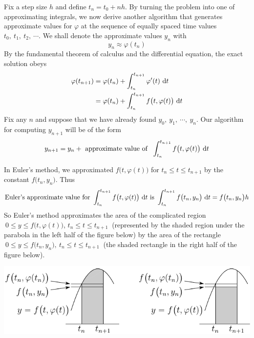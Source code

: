Fix a step size $h$ and define $t_n=t_0+nh$. By turning the problem into one 
of approximating integrals, we now derive another algorithm
that generates approximate values for $\varphi$ at the sequence of equally
spaced time values $t_0,\ t_1,\ t_2,\ \cdots$. We shall denote the approximate
values $y_n$ with
\begin{equation*}
y_n\approx\varphi(t_n)
\end{equation*}
By the fundamental theorem of calculus and the differential equation, the 
exact solution obeys
\begin{align*}
\varphi(t_{n+1})&=\varphi(t_n)+\int_{t_n}^{t_{n+1}}\varphi'(t)\ \mathrm{d}t \\
&=\varphi(t_n)+\int_{t_n}^{t_{n+1}}f\big(t,\varphi(t)\big)\ \mathrm{d}t
\end{align*}
Fix any $n$ and suppose that we have already found $y_0,\ y_1,\ \cdots,\ y_n$.
Our algorithm for computing $y_{n+1}$ will be of the form
\begin{equation*}
y_{n+1}=y_n+\text{\ approximate\ value\ of \ }
\int_{t_n}^{t_{n+1}}f\big(t,\varphi(t)\big)\ \mathrm{d}t
\end{equation*}

In Euler's method, we approximated $f\big(t,\varphi(t)\big)$ 
for $t_n\le t\le t_{n+1}$ by
the constant $f\big(t_n,y_n\big)$. Thus
\begin{equation*}
\text{Euler's approximate value for\ }
\int_{t_n}^{t_{n+1}}f\big(t,\varphi(t)\big)\ \mathrm{d}t
\text{ is }\int_{t_n}^{t_{n+1}}f\big(t_n,y_n\big)\ \mathrm{d}t
=f\big(t_n,y_n\big)h
\end{equation*}
So Euler's method approximates the area of the complicated region
$\ 0\le y\le  f\big(t,\varphi(t)\big)$, $t_n\le t\le t_{n+1}\ $
(represented by the shaded region under the parabola in the left half
of the figure below) by the area of the rectangle 
$\ 0\le y\le  f\big(t_n,y_n\big),\ t_n\le t\le t_{n+1}\ $
(the shaded rectangle in the right half
of the figure below).

\begin{efig}
\begin{center}
    \includegraphics{euler.pdf}
\end{center}
\end{efig}

